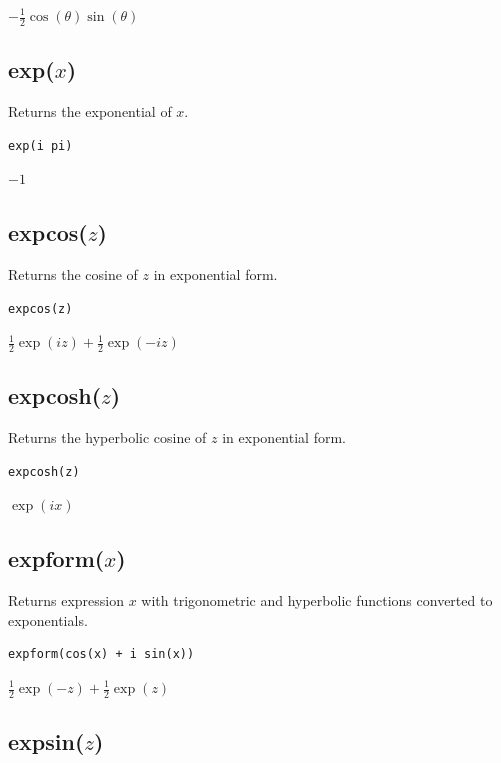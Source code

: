 \documentclass[12pt]{article}
\begin{document}
$\displaystyle
-\tfrac{1}{2}\cos(\theta)\sin(\theta)
$

\subsection*{exp($x$)}

Returns the exponential of $x$.

{\color{blue}
\begin{verbatim}
exp(i pi)
\end{verbatim}
}

\noindent
$-1$

\subsection*{expcos($z$)}

Returns the cosine of $z$ in exponential form.

{\color{blue}
\begin{verbatim}
expcos(z)
\end{verbatim}
}

\noindent
$\displaystyle \tfrac{1}{2}\exp(iz)+\tfrac{1}{2}\exp(-iz)$

\subsection*{expcosh($z$)}

Returns the hyperbolic cosine of $z$ in exponential form.

{\color{blue}
\begin{verbatim}
expcosh(z)
\end{verbatim}
}

\noindent
$\exp(ix)$

\subsection*{expform($x$)}

Returns expression $x$ with trigonometric and hyperbolic functions
converted to exponentials.

{\color{blue}
\begin{verbatim}
expform(cos(x) + i sin(x))
\end{verbatim}
}

\noindent
$\displaystyle \tfrac{1}{2}\exp(-z)+\tfrac{1}{2}\exp(z)$

\subsection*{expsin($z$)}
\end{document}
